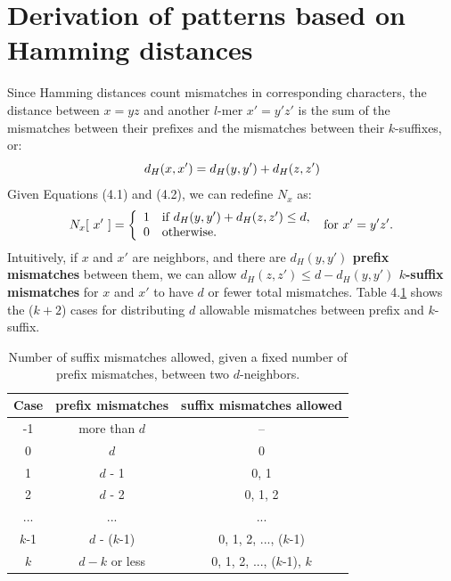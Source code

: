 \documentclass[oneside,12pt]{DISCSthesis}
\begin{document}
{	\section{Derivation of patterns based on Hamming distances}
		\noindent Since Hamming distances count mismatches in corresponding characters, the distance between $x = yz$ and another $l$-mer $x' = y'z'$ is the sum of the mismatches between their prefixes and the mismatches between their $k$-suffixes, or:\vspace*{-4mm} 
		\begin{equation} d_H(x,x') = d_H(y,y') + d_H(z,z')\vspace*{-4mm}\end{equation}
		Given Equations (4.1) and (4.2), we can redefine $N_x$ as:\vspace*{-4mm}
		\begin{equation}
			N_{x}[\ x'\ ] = \left\{
			\begin{array}{rl}
				1 & \text{if } d_H(y,y') + d_H(z,z') \leq d,\\
				0 & \text{otherwise.}
			\end{array} \right.
			\text{ for }x' = y'z'.\vspace*{-4mm}	
			\end{equation}
		Intuitively, if $x$ and $x'$ are neighbors, and there are {\bf\boldmath $d_H(y,y')$  prefix mismatches} between them, we can  allow {\bf\boldmath $d_H(z,z') \leq d - d_H(y,y')$ $k$-suffix mismatches} for $x$ and $x'$ to have $d$ or fewer total mismatches. Table 4.\ref{tbl:cases_prefix_suffix} shows the ($k+2$) cases for distributing $d$ allowable mismatches between prefix and $k$-suffix.\vspace*{3mm}
		\begin{table}[h] \label{tbl:cases_prefix_suffix}
			\centering\renewcommand{\arraystretch}{1.25}
			\begin{tabular}{|c|c|c|}
			\hline
			\bfseries Case & \bfseries prefix mismatches & \bfseries\boldmath suffix mismatches allowed \\
			\hline
			-1 	  &	more than $d$ 	& --		\\
			0 	  & $d$ 			& 0 		\\
			1 	  & $d$ - 1 		& 0, 1 		\\
			2 	  & $d$ - 2 		& 0, 1, 2 	\\
			...   & ...				& ...		\\
			$k$-1 & $d$ - ($k$-1) 	& 0, 1, 2, ..., ($k$-1) \\
			$k$   & $d-k$ or less 	& 0, 1, 2, ..., ($k$-1), $k$ \\
			\hline
			\end{tabular}
			\caption{Number of suffix mismatches allowed, given a fixed number of prefix mismatches, between two $d$-neighbors.}
			\end{table}
		
}
\end{document}
